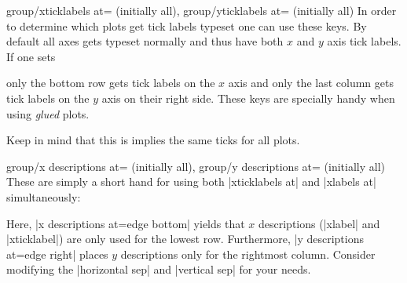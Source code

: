 {\begin{pgfplotskeylist}{%
    group/xticklabels at= (initially all),
    group/yticklabels at= (initially all)%
}
    In order to determine which plots get tick labels typeset one can use these
    keys. By default all axes gets typeset normally and thus have both $x$ and
    $y$ axis tick labels. If one sets
\begin{codeexample}
\pgfplotsset{
    group/xticklabels at=edge bottom,
    group/yticklabels at=edge right,
}
\end{codeexample}
    only the bottom row gets tick labels on the $x$ axis and only the last
    column gets tick labels on the $y$ axis on their right side. These keys are
    specially handy when using \textit{glued} plots.

    Keep in mind that this is implies the same ticks for all plots.
\end{pgfplotskeylist}

\begin{pgfplotskeylist}{%
    group/x descriptions at= (initially all),
    group/y descriptions at= (initially all)%
}
    These are simply a short hand for using both |xticklabels at| and
    |xlabels at| simultaneously:
\begin{codeexample}[]
\end{codeexample}

    Here, |x descriptions at=edge bottom| yields that $x$ descriptions
    (|xlabel| and |xticklabel|) are only used for the lowest row. Furthermore,
    |y descriptions at=edge right| places $y$ descriptions only for the
    rightmost column. Consider modifying the |horizontal sep| and
    |vertical sep| for your needs.


\end{pgfplotskeylist}}
